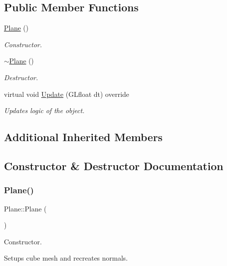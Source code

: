 \subsection*{Public Member Functions}
\begin{DoxyCompactItemize}
\item 
\mbox{\hyperlink{class_plane_acac0d9c003e0ab10d07b146c3566a0c7}{Plane}} ()
\begin{DoxyCompactList}\small\item\em Constructor. \end{DoxyCompactList}\item 
\mbox{\hyperlink{class_plane_a69abd86051c880dcb44b249ad10c4436}{$\sim$\+Plane}} ()
\begin{DoxyCompactList}\small\item\em Destructor. \end{DoxyCompactList}\item 
virtual void \mbox{\hyperlink{class_plane_af1ed004221fa7b42136789cb2c48b124}{Update}} (G\+Lfloat dt) override
\begin{DoxyCompactList}\small\item\em Updates logic of the object. \end{DoxyCompactList}\end{DoxyCompactItemize}
\subsection*{Additional Inherited Members}


\subsection{Constructor \& Destructor Documentation}
\mbox{\label{class_plane_acac0d9c003e0ab10d07b146c3566a0c7}} 
\subsubsection{\texorpdfstring{Plane()}{Plane()}}
{\footnotesize\ttfamily Plane\+::\+Plane (\begin{DoxyParamCaption}{ }\end{DoxyParamCaption})}



Constructor. 

Setups cube mesh and recreates normals. \mbox{\label{class_plane_a69abd86051c880dcb44b249ad10c4436}} 
